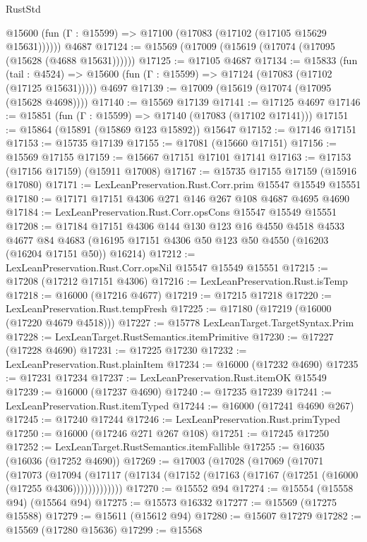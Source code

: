 \begin{lexlean}{RustStd}
\begin{coremodule}
      @15600 (fun (Γ : @15599) => @17100 (@17083 (@17102 (@17105 @15629 @15631))))))
    @4687
@17124 := @15569 (@17009 (@15619 (@17074 (@17095 (@15628 (@4688 @15631))))))
@17125 := @17105 @4687
@17134 := @15833
    (fun (tail : @4524) => @15600 (fun (Γ : @15599) => @17124 (@17083 (@17102 (@17125 @15631)))))
    @4697
@17139 := @17009 (@15619 (@17074 (@17095 (@15628 @4698))))
@17140 := @15569 @17139
@17141 := @17125 @4697
@17146 := @15851 (fun (Γ : @15599) => @17140 (@17083 (@17102 @17141)))
@17151 := @15864 (@15891 (@15869 @123 @15892)) @15647
@17152 := @17146 @17151
@17153 := @15735 @17139
@17155 := @17081 (@15660 @17151)
@17156 := @15569 @17155
@17159 := @15667 @17151 @17101 @17141
@17163 := @17153 (@17156 @17159) (@15911 @17008)
@17167 := @15735 @17155 @17159 (@15916 @17080)
@17171 := LexLeanPreservation.Rust.Corr.prim @15547 @15549 @15551
@17180 := @17171 @17151 @4306 @271 @146 @267 @108 @4687 @4695 @4690
@17184 := LexLeanPreservation.Rust.Corr.opsCons @15547 @15549 @15551
@17208 := @17184
    @17151
    @4306
    @144
    @130
    @123
    @16
    @4550
    @4518
    @4533
    @4677
    @84
    @4683
    (@16195 @17151 @4306 @50 @123 @50 @4550 (@16203 (@16204 @17151 @50)) @16214)
@17212 := LexLeanPreservation.Rust.Corr.opsNil @15547 @15549 @15551
@17215 := @17208 (@17212 @17151 @4306)
@17216 := LexLeanPreservation.Rust.isTemp
@17218 := @16000 (@17216 @4677)
@17219 := @17215 @17218
@17220 := LexLeanPreservation.Rust.tempFresh
@17225 := @17180 (@17219 (@16000 (@17220 @4679 @4518)))
@17227 := @15778 LexLeanTarget.TargetSyntax.Prim
@17228 := LexLeanTarget.RustSemantics.itemPrimitive
@17230 := @17227 (@17228 @4690)
@17231 := @17225 @17230
@17232 := LexLeanPreservation.Rust.plainItem
@17234 := @16000 (@17232 @4690)
@17235 := @17231 @17234
@17237 := LexLeanPreservation.Rust.itemOK @15549
@17239 := @16000 (@17237 @4690)
@17240 := @17235 @17239
@17241 := LexLeanPreservation.Rust.itemTyped
@17244 := @16000 (@17241 @4690 @267)
@17245 := @17240 @17244
@17246 := LexLeanPreservation.Rust.primTyped
@17250 := @16000 (@17246 @271 @267 @108)
@17251 := @17245 @17250
@17252 := LexLeanTarget.RustSemantics.itemFallible
@17255 := @16035 (@16036 (@17252 @4690))
@17269 := @17003
    (@17028
      (@17069
        (@17071
          (@17073
            (@17094
              (@17117 (@17134 (@17152 (@17163 (@17167 (@17251 (@16000 (@17255 @4306)))))))))))))
@17270 := @15552 @94
@17274 := @15554 (@15558 @94) (@15564 @94)
@17275 := @15573 @16332
@17277 := @15569 (@17275 @15588)
@17279 := @15611 (@15612 @94)
@17280 := @15607 @17279
@17282 := @15569 (@17280 @15636)
@17299 := @15568

\end{coremodule}
\end{lexlean}
